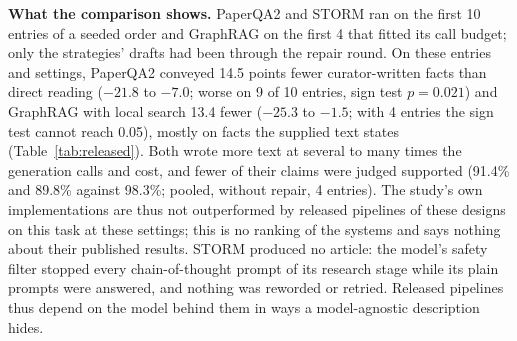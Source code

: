\documentclass{article} %
\begin{document}
\textbf{What the comparison shows.} PaperQA2 and STORM ran on the first 10 entries of a seeded order and GraphRAG on the first 4 that fitted its call budget; only the strategies' drafts had been through the repair round. On these entries and settings, PaperQA2 conveyed 14.5 points fewer curator-written facts than direct reading ($-21.8$ to $-7.0$; worse on 9 of 10 entries, sign test $p=0.021$) and GraphRAG with local search 13.4 fewer ($-25.3$ to $-1.5$; with 4 entries the sign test cannot reach 0.05), mostly on facts the supplied text states (Table~\ref{tab:released}). Both wrote more text at several to many times the generation calls and cost, and fewer of their claims were judged supported (91.4\% and 89.8\% against 98.3\%; pooled, without repair, 4 entries). The study's own implementations are thus not outperformed by released pipelines of these designs on this task at these settings; this is no ranking of the systems and says nothing about their published results. STORM produced no article: the model's safety filter stopped every chain-of-thought prompt of its research stage while its plain prompts were answered, and nothing was reworded or retried. Released pipelines thus depend on the model behind them in ways a model-agnostic description hides.
\end{document}
